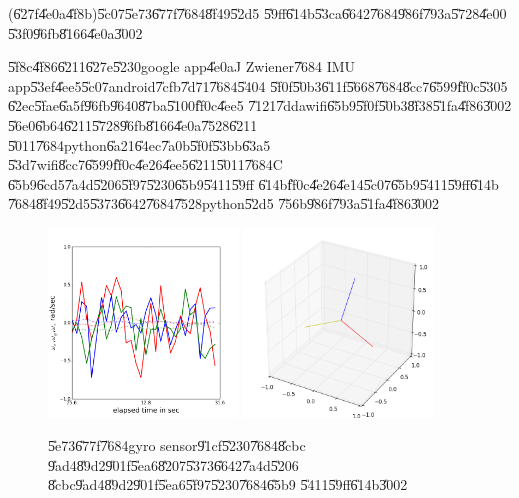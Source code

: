 \clearpage%

\begin{case}
(\U{627f}\U{4e0a}\U{4f8b})\U{5c07}\U{5e73}\U{677f}\U{7684}\U{8f49}\U{52d5}%
\U{59ff}\U{614b}\U{53ca}\U{6642}\U{7684}\U{986f}\U{793a}\U{5728}\U{4e00}%
\U{53f0}\U{96fb}\U{8166}\U{4e0a}\U{3002}
\end{case}

\U{5f8c}\U{4f86}\U{6211}\U{627e}\U{5230}google app\U{4e0a}J Zwiener\U{7684}%
IMU app\U{53ef}\U{4ee5}\U{5c07}android\U{7cfb}\U{7d71}\U{7684}\U{5404}%
\U{5f0f}\U{50b3}\U{611f}\U{5668}\U{7684}\U{8cc7}\U{6599}\U{ff0c}\U{5305}%
\U{62ec}\U{5fae}\U{6a5f}\U{96fb}\U{9640}\U{87ba}\U{5100}\U{ff0c}\U{4ee5}%
\U{7121}\U{7dda}wifi\U{65b9}\U{5f0f}\U{50b3}\U{8f38}\U{51fa}\U{4f86}\U{3002}%
\U{56e0}\U{6b64}\U{6211}\U{5728}\U{96fb}\U{8166}\U{4e0a}\U{7528}\U{6211}%
\U{5011}\U{7684}python\U{6a21}\U{64ec}\U{7a0b}\U{5f0f}\U{53bb}\U{63a5}%
\U{53d7}wifi\U{8cc7}\U{6599}\U{ff0c}\U{4e26}\U{4ee5}\U{6211}\U{5011}\U{7684}C%
\U{65b9}\U{6cd5}\U{7a4d}\U{5206}\U{5f97}\U{5230}\U{65b9}\U{5411}\U{59ff}%
\U{614b}\U{ff0c}\U{4e26}\U{4e14}\U{5c07}\U{65b9}\U{5411}\U{59ff}\U{614b}%
\U{7684}\U{8f49}\U{52d5}\U{5373}\U{6642}\U{7684}\U{7528}python\U{52d5}%
\U{756b}\U{986f}\U{793a}\U{51fa}\U{4f86}\U{3002}\newline
\begin{figure}[th]
\caption{\U{5e73}\U{677f}\U{7684}gyro sensor\U{91cf}\U{5230}\U{7684}\U{8cbc}%
\U{9ad4}\U{89d2}\U{901f}\U{5ea6}\U{8207}\U{5373}\U{6642}\U{7a4d}\U{5206}%
\U{8cbc}\U{9ad4}\U{89d2}\U{901f}\U{5ea6}\U{5f97}\U{5230}\U{7684}\U{65b9}%
\U{5411}\U{59ff}\U{614b}\U{3002}}
\begin{center}
\includegraphics[width=0.45\textwidth]{./figs/Zwiener_1.png}%
\includegraphics[width=0.45\textwidth]{./figs/Zwiener_2.png}
\end{center}
\end{figure}
